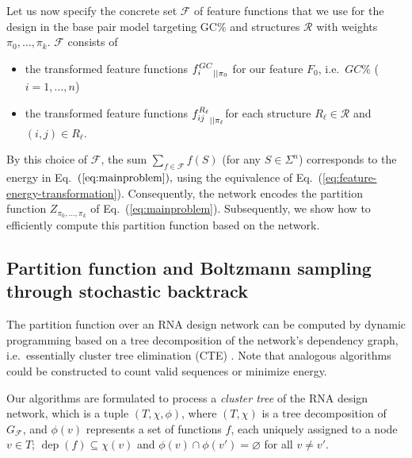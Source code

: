 \documentclass{bmcart}
\newcommand{\dep}{\operatorname{dep}}
\newcommand{\partfun}[1]{Z_{#1}}
\newcommand{\F}{\mathcal{F}}
\newcommand{\R}{\mathcal{R}}
\newcommand{\Def}[1]{\emph{#1}}
\newcommand{\Nuc}[1]{{\sf #1}}
\newcommand{\Cb}{\Nuc{C}}
\newcommand{\Gb}{\Nuc{G}}
\newcommand{\GCb}{\Gb\Cb}
\newcommand{\citep}[1]{\cite{#1}}
\begin{document}
Let us now specify the concrete set $\F$ of feature functions that we use
for the design in the base pair model targeting \GCb\% and structures $\R$ with weights $\pi_0,\dots,\pi_k$. $\F$ consists of
\begin{itemize}
\item the transformed feature functions ${f^{GC}_i}_{||{\pi_0}}$ for our feature $F_0$, i.e.~$GC\%$ ($i=1,\dots,n$)
\item the transformed feature functions ${f^{R_\ell}_{ij}}_{||{\pi_\ell}}$for each structure $R_\ell\in\R$ and $(i,j)\in R_\ell.$
\end{itemize}

By this choice of $\F$, the sum $\sum_{f\in\F} f(S)$ (for any $S\in\Sigma^n$) corresponds to the energy in
Eq.~$(\ref{eq:mainproblem}),$ using the equivalence of Eq.~(\ref{eq:feature-energy-transformation}). 
Consequently, the network encodes the partition function $\partfun{\pi_0,\dots,\pi_k}$ of Eq.~(\ref{eq:mainproblem}). Subsequently, we show how to efficiently compute this partition function based on the network.

\subsection*{Partition function and Boltzmann sampling through stochastic backtrack}\label{sec:PF}

The partition function
over an RNA design network can be computed by dynamic programming based
on a tree decomposition of the network's dependency graph,
i.e.~essentially cluster tree elimination (CTE) \citep{Dechter2013}. Note that analogous algorithms could be constructed to count valid sequences or minimize energy.

%

Our algorithms are formulated to process a \Def{cluster tree} of the
RNA design network, which is a tuple $(T,\chi,\phi)$, where
$(T,\chi)$ is a tree decomposition of $G_\F$, and $\phi(v)$ represents
a set of functions $f$, each uniquely assigned to a node $v\in T$;
$\dep(f)\subseteq\chi(v)$ and $\phi(v)\cap \phi(v')=\varnothing$ for
all $v\neq v'$. 
\end{document}
